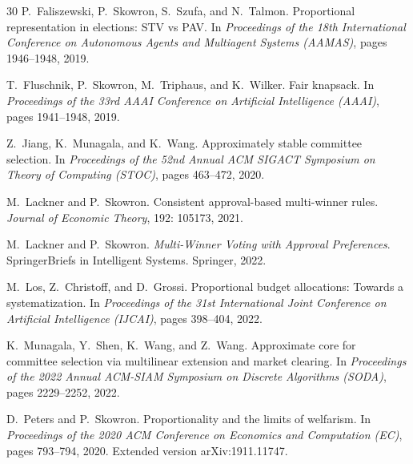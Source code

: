 \documentclass[10pt]{scrartcl}
\theoremstyle{definition}
\theoremstyle{plain}
\begin{document}
\begin{thebibliography}{30}
	P.~Faliszewski, P.~Skowron, S.~Szufa, and N.~Talmon.
	\newblock Proportional representation in elections: {STV} vs {PAV}.
	\newblock In \emph{Proceedings of the 18th International Conference on
		Autonomous Agents and Multiagent Systems (AAMAS)}, pages 1946--1948, 2019.
	
	T.~Fluschnik, P.~Skowron, M.~Triphaus, and K.~Wilker.
	\newblock Fair knapsack.
	\newblock In \emph{Proceedings of the 33rd AAAI Conference on Artificial
		Intelligence (AAAI)}, pages 1941--1948, 2019.
	
	Z.~Jiang, K.~Munagala, and K.~Wang.
	\newblock Approximately stable committee selection.
	\newblock In \emph{Proceedings of the 52nd Annual ACM SIGACT Symposium on
		Theory of Computing (STOC)}, pages 463--472, 2020.
	
	M.~Lackner and P.~Skowron.
	\newblock Consistent approval-based multi-winner rules.
	\newblock \emph{Journal of Economic Theory}, 192: 105173, 2021.
	
	M.~Lackner and P.~Skowron.
	\newblock \emph{Multi-Winner Voting with Approval Preferences}.
	\newblock SpringerBriefs in Intelligent Systems. Springer, 2022.
	
	M.~Los, Z.~Christoff, and D.~Grossi.
	\newblock Proportional budget allocations: Towards a systematization.
	\newblock In \emph{Proceedings of the 31st International Joint Conference on
		Artificial Intelligence (IJCAI)}, pages 398--404, 2022.
	
	K.~Munagala, Y.~Shen, K.~Wang, and Z.~Wang.
	\newblock Approximate core for committee selection via multilinear extension
	and market clearing.
	\newblock In \emph{Proceedings of the 2022 Annual ACM-SIAM Symposium on
		Discrete Algorithms (SODA)}, pages 2229--2252, 2022.
	
	D.~Peters and P.~Skowron.
	\newblock Proportionality and the limits of welfarism.
	\newblock In \emph{Proceedings of the 2020 ACM Conference on Economics and
		Computation (EC)}, pages 793--794, 2020.
	\newblock Extended version arXiv:1911.11747.
	

\end{thebibliography}
\end{document}
